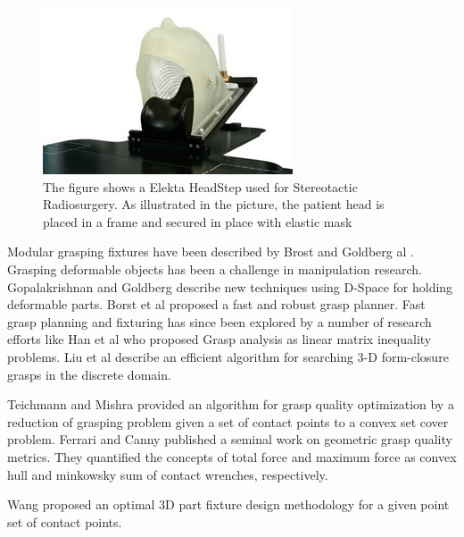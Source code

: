 \begin{figure}[t!]
  \begin{center}
    \includegraphics[width=0.75\linewidth]{images/headstep}
  \end{center}
  \vspace{-10pt}
\caption{ The figure shows a Elekta HeadStep used for Stereotactic Radiosurgery.
As illustrated in the picture, the patient head is placed in a frame and secured in place with elastic mask}
  \vspace*{-15pt}
  \label{fig:HeadStep}
\end{figure}

Modular grasping fixtures have been described by Brost and Goldberg al 
\cite{brost1996complete}. Grasping deformable objects has been a challenge 
in manipulation research. Gopalakrishnan and Goldberg 
\cite{gopalakrishnan2004Dspace} describe new techniques using D-Space for
holding deformable parts. Borst et al \cite{borst1999fast} proposed a 
fast and robust grasp planner. Fast grasp planning and fixturing has since been 
explored by a number of research efforts like Han et al\cite{han2000grasp} who proposed Grasp analysis as linear matrix inequality problems. Liu et al \cite{liu2004complete} describe an efficient algorithm for searching 3-D form-closure grasps in the discrete domain.


Teichmann and Mishra \cite{teichmann2000probabilistic} provided an algorithm for 
grasp quality optimization by a reduction of grasping problem given a set 
of contact points to a convex set cover problem. Ferrari and Canny
\cite{ferrari1992planning} published a seminal work on
geometric grasp quality metrics. They quantified the concepts of total 
force and maximum force as convex hull and minkowsky sum of contact wrenches,
respectively.

Wang \cite{wang2000optimum} proposed an optimal 3D part fixture design 
methodology for a given point set of contact points. 

